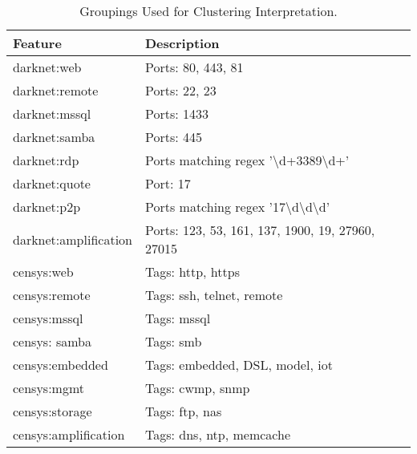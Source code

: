 \documentclass[manuscript, nonacm]{acmart}
\begin{document}
\begin{table}[t]
\small%
\centering
\caption{Groupings Used for Clustering Interpretation.}
\label{table:orion:tags}
\begin{tabular}{l|l}

\hline
\textbf{Feature}    & \textbf{Description}                                                         \\ \hline
darknet:web           & Ports: 80, 443, 81                                                           \\ 
darknet:remote        & Ports: 22, 23                                                                \\ 
darknet:mssql         & Ports: 1433                                                                  \\ 
darknet:samba         & Ports: 445                                                                   \\ 
darknet:rdp           & Ports matching regex '\textbackslash{}d+3389\textbackslash{}d+'              \\ 
darknet:quote         & Port: 17                                                                     \\ 
darknet:p2p           & Ports matching regex '17\textbackslash{}d\textbackslash{}d\textbackslash{}d' \\ 
darknet:amplification & Ports: 123, 53, 161, 137, 1900, 19, 27960, 27015                             \\ 
censys:web           & Tags: http, https                                                            \\ 
censys:remote        & Tags: ssh, telnet, remote                                                    \\ 
censys:mssql         & Tags: mssql                                                                  \\ 
censys: samba        & Tags: smb                                                                    \\ 
censys:embedded      & Tags: embedded, DSL, model, iot                                              \\ 
censys:mgmt          & Tags: cwmp, snmp                                                             \\ 
censys:storage       & Tags: ftp, nas                                                               \\ 
censys:amplification & Tags: dns, ntp, memcache                                                     \\ 

\end{tabular}
\end{table}
\end{document}
